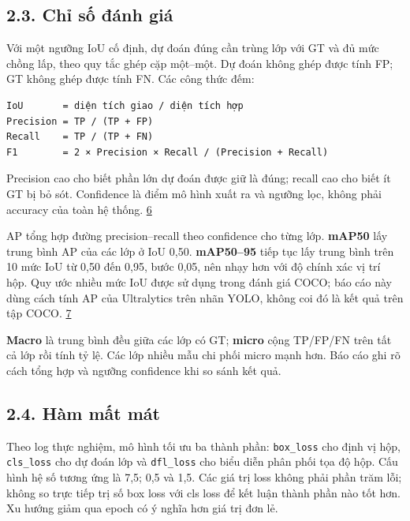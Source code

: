 \documentclass[
  vietnamese,
  12pt,
  a4paper,
]{article}
\begin{document}
\subsection{2.3. Chỉ số đánh
giá}\label{chux1ec9-sux1ed1-ux111uxe1nh-giuxe1}

Với một ngưỡng IoU cố định, dự đoán đúng cần trùng lớp với GT và đủ mức
chồng lấp, theo quy tắc ghép cặp một--một. Dự đoán không ghép được tính
FP; GT không ghép được tính FN. Các công thức đếm:

\begin{Verbatim}[breaklines=true,breakanywhere=true,fontsize=\footnotesize,baselinestretch=1]
IoU       = diện tích giao / diện tích hợp
Precision = TP / (TP + FP)
Recall    = TP / (TP + FN)
F1        = 2 × Precision × Recall / (Precision + Recall)
\end{Verbatim}

Precision cao cho biết phần lớn dự đoán được giữ là đúng; recall cao cho
biết ít GT bị bỏ sót. Confidence là điểm mô hình xuất ra và ngưỡng lọc,
không phải accuracy của toàn hệ thống.
\href{https://docs.ultralytics.com/guides/yolo-performance-metrics/}{6}

AP tổng hợp đường precision--recall theo confidence cho từng lớp.
\textbf{mAP50} lấy trung bình AP của các lớp ở IoU 0,50.
\textbf{mAP50--95} tiếp tục lấy trung bình trên 10 mức IoU từ 0,50 đến
0,95, bước 0,05, nên nhạy hơn với độ chính xác vị trí hộp. Quy ước nhiều
mức IoU được sử dụng trong đánh giá COCO; báo cáo này dùng cách tính AP
của Ultralytics trên nhãn YOLO, không coi đó là kết quả trên tập COCO.
\href{https://cocodataset.org/\#detection-eval}{7}

\textbf{Macro} là trung bình đều giữa các lớp có GT; \textbf{micro} cộng
TP/FP/FN trên tất cả lớp rồi tính tỷ lệ. Các lớp nhiều mẫu chi phối
micro mạnh hơn. Báo cáo ghi rõ cách tổng hợp và ngưỡng confidence khi so
sánh kết quả.

\subsection{2.4. Hàm mất mát}\label{huxe0m-mux1ea5t-muxe1t}

Theo log thực nghiệm, mô hình tối ưu ba thành phần:
\texttt{b\allowbreak{}o\allowbreak{}x\allowbreak{}\_\allowbreak{}l\allowbreak{}o\allowbreak{}s\allowbreak{}s\allowbreak{}}
cho định vị hộp,
\texttt{c\allowbreak{}l\allowbreak{}s\allowbreak{}\_\allowbreak{}l\allowbreak{}o\allowbreak{}s\allowbreak{}s\allowbreak{}}
cho dự đoán lớp và
\texttt{d\allowbreak{}f\allowbreak{}l\allowbreak{}\_\allowbreak{}l\allowbreak{}o\allowbreak{}s\allowbreak{}s\allowbreak{}}
cho biểu diễn phân phối tọa độ hộp. Cấu hình hệ số tương ứng là 7,5; 0,5
và 1,5. Các giá trị loss không phải phần trăm lỗi; không so trực tiếp
trị số box loss với cls loss để kết luận thành phần nào tốt hơn. Xu
hướng giảm qua epoch có ý nghĩa hơn giá trị đơn lẻ.
\end{document}

